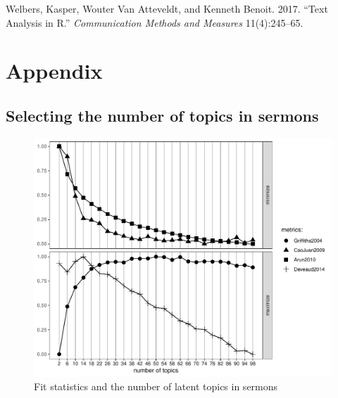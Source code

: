 \documentclass[
  12pt,
]{article}
\begin{document}
\leavevmode\hypertarget{ref-WVB17}{}%
Welbers, Kasper, Wouter Van Atteveldt, and Kenneth Benoit. 2017. ``Text Analysis in R.'' \emph{Communication Methods and Measures} 11(4):245--65.

\clearpage

\appendix

\hypertarget{appendix}{%
\section{Appendix}\label{appendix}}

\hypertarget{sec:topnum}{%
\subsection{Selecting the number of topics in sermons}\label{sec:topnum}}

\begin{figure}
\centering
\includegraphics{Khutbas_files/figure-latex/number-topics.pdf}
\caption{\label{fig:unnamed-chunk-1}Fit statistics and the number of latent topics in sermons}
\end{figure}
\end{document}

